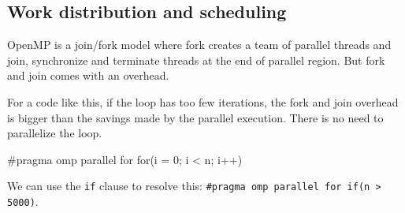\subsection{Work distribution and scheduling}
    \begin{tcolorbox}[violet]
        OpenMP is a join/fork model where fork creates a team of parallel threads and join, synchronize and terminate threads  at the end of parallel region. But fork and join comes with an overhead.
    \end{tcolorbox}
    \begin{image}{For a code like this, if the loop has too few iterations, the fork and join overhead is bigger than the savings made by the parallel execution. There is no need to parallelize the loop.}
        \begin{codeCenter}
        \begin{Ccode}
#pragma omp parallel for
for(i = 0; i < n; i++)
        \end{Ccode}
        \end{codeCenter}
    \end{image}
    We can use the \lstinline!if! clause to resolve this: \lstinline!#pragma omp parallel for if(n > 5000)!.\\

